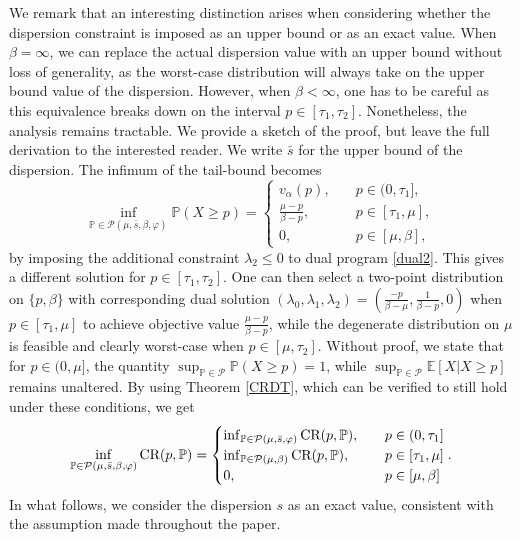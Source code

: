 \documentclass[11pt]{article}
\newcommand{\bP}{\mathbb{P}}
\newcommand{\cP}{\mathcal{P}}
\newcommand{\bE}{\mathbb{E}}
\newcommand{\1}{\mathds{1}}
\begin{document}
We remark that an interesting distinction arises when considering whether the dispersion constraint is imposed as an upper bound or as an exact value. When $\beta=\infty$, we can replace the actual dispersion value with an upper bound without loss of generality, as the worst-case distribution will always take on the upper bound value of the dispersion. However, when $\beta<\infty$, one has to be careful as this equivalence breaks down on the interval $p\in[\tau_1,\tau_2]$. Nonetheless, the analysis remains tractable. We provide a sketch of the proof, but leave the full derivation to the interested reader. We write $\bar{s}$ for the upper bound of the dispersion. The infimum of the tail-bound becomes \begin{equation*}
    \inf_{\bP \in \cP(\mu,\bar{s},\beta,\varphi)}\bP(X \geq p)=
    \begin{cases}
     v_\alpha(p), \quad & p\in(0,\tau_1], \\
      \frac{\mu-p}{\beta-p}, \quad & p\in[\tau_1,\mu], \\
    0, & p \in[\mu,\beta],
    \end{cases}
\end{equation*} by imposing the additional constraint $\lambda_2 \leq 0$ to dual program \ref{dual2}. This gives a different solution for $p \in [\tau_1,\tau_2]$. One can then select a two-point distribution on $\{p,\beta\}$ with corresponding dual solution $(\lambda_0,\lambda_1,\lambda_2) = (\frac{-p}{\beta-\mu},\frac{1}{\beta-p},0)$ when $p \in [\tau_1,\mu]$ to achieve objective value $\frac{\mu-p}{\beta-p}$, while the degenerate distribution on $\mu$ is feasible and clearly worst-case when $p \in [\mu,\tau_2]$. Without proof, we state that for $p\in (0,\mu]$, the quantity $\sup_{\bP\in\cP}\bP(X\geq p)=1$, while $\sup_{\bP\in\cP}\bE[X|X\geq p]$ remains unaltered. By using Theorem \ref{CRDT}, which can be verified to still hold under these conditions, we get
\begin{align*}
\inf_{\bP\in\cP(\mu,\bar{s},\beta,\varphi)}\textup{CR}(p,\bP) = \begin{cases}
    \inf_{\bP\in\cP(\mu,\bar{s},\varphi)}\textup{CR}(p,\bP), &\quad p \in (0,\tau_1]\\
    \inf_{\bP\in\cP(\mu,\beta)}\textup{CR}(p,\bP), &\quad p \in [\tau_1,\mu]\\
    0, &\quad p\in [\mu,\beta]
\end{cases}.
\end{align*} In what follows, we consider the dispersion $s$ as an exact value, consistent with the assumption made throughout the paper.
\end{document}
